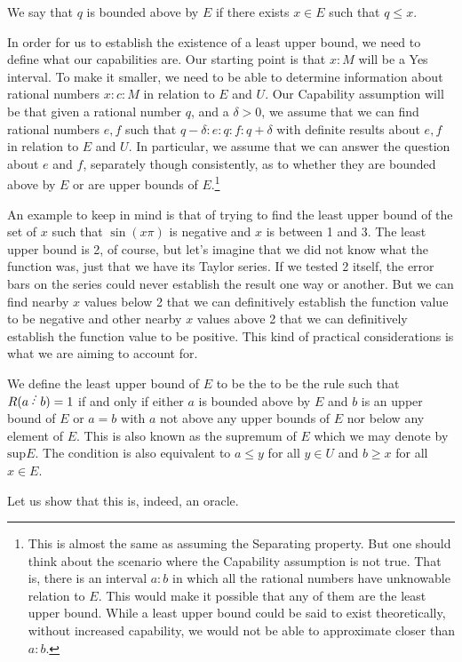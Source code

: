\documentclass[12pt]{article}
\begin{document}
We say that $q$ is bounded above by $E$ if there exists $x \in E$ such that $q \leq x$.

In order for us to establish the existence of a least upper bound, we need to define what our capabilities are. Our starting point is that $x:M$ will be a Yes interval. To make it smaller, we need to be able to determine information about rational numbers $x:c:M$ in relation to $E$ and $U$. Our Capability assumption will be that given a rational number $q$, and a $\delta > 0$, we assume that we can find rational numbers $e,f$  such that $q-\delta:e:q:f:q+\delta$ with definite results about $e,f$ in relation to $E$ and $U$. In particular, we assume that we can answer the question about $e$ and $f$, separately though consistently, as to whether they are bounded above by $E$ or are upper bounds of $E$.\footnote{This is almost the same as assuming the Separating property. But one should think about the scenario where the Capability assumption is not true. That is, there is an interval $a:b$ in which all the rational numbers have unknowable relation to $E$. This would make it possible that any of them are the least upper bound. While a least upper bound could be said to exist theoretically, without increased capability, we would not be able to approximate closer than $a:b$.} 

An example to keep in mind is that of trying to find the least upper bound of the set of $x$ such that $\sin(x \pi)$ is negative and $x$ is between 1 and 3. The least upper bound is 2, of course, but let's imagine that we did not know what the function was, just that we have its Taylor series. If we tested 2 itself, the error bars on the series could never establish the result one way or another. But we can find nearby $x$ values below 2 that we can definitively establish the function value to be negative and other nearby $x$ values above 2 that we can definitively establish the function value to be positive. This kind of practical considerations is what we are aiming to account for. 

We define the least upper bound of $E$ to be the to be the rule such that $R(a\lte b) = 1$ if and only if either $a$ is bounded above by $E$ and $b$ is an upper bound of $E$ or $a=b$ with $a$ not above any upper bounds of $E$ nor below any element of $E$. This is also known as the supremum of $E$ which we may denote by $\mathrm{sup} E$. The condition is also equivalent to $a \leq y$ for all $y \in U$ and $b \geq x$ for all $x \in E$.

Let us show that this is, indeed, an oracle. 
\end{document}
